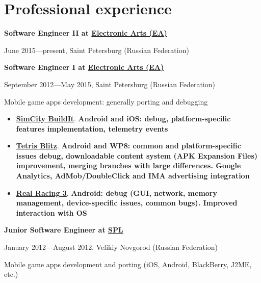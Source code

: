 \section{Professional experience}
{
\fontsize{12pt}{12pt}\selectfont
\bfseries Software Engineer II at
\href{http://www.ea.com}{Electronic Arts (EA)}
\mdseries
}

{
\fontsize{9pt}{8pt}\selectfont
June 2015---present, Saint Petersburg (Russian Federation)
}
\vspace{5pt}

{
\fontsize{12pt}{12pt}\selectfont
\bfseries Software Engineer I at
\href{http://www.ea.com}{Electronic Arts (EA)}
\mdseries
}

{
\fontsize{9pt}{8pt}\selectfont
September 2012---May 2015, Saint Petersburg (Russian Federation)
}

\subitem Mobile game apps development: generally porting and debugging
\begin{itemize}
\setlength{\itemindent}{20pt}
\item
    \href{http://www.ea.com/simcity-buildit}
        {\bfseries SimCity BuildIt\mdseries}.
        \bfseries Android \mdseries and \bfseries iOS\mdseries:
        debug,
        platform-specific features implementation,
        telemetry events
\item
    \href{http://www.tetrisblitz.com}
        {\bfseries Tetris Blitz\mdseries}.
        \bfseries Android \mdseries and \bfseries WP8\mdseries:
        common and platform-specific issues debug,
        downloadable content system (APK Expansion Files) improvement,
        merging branches with large differences.
        Google Analytics, AdMob/DoubleClick and IMA advertising integration
\item
    \href{http://www.ea.com/real-racing-3}
    {\bfseries Real Racing 3\mdseries}.
        \bfseries Android\mdseries:
        debug (GUI, network, memory management, device-specific issues, common bugs).
        Improved interaction with OS
\end{itemize}

\vspace{5pt}

{
\fontsize{12pt}{12pt}\selectfont
\bfseries Junior Software Engineer at
\href{http://spl.co}{\bfseries SPL\mdseries}
\mdseries
}

{
\fontsize{9pt}{8pt}\selectfont
January 2012---August 2012, Velikiy Novgorod (Russian Federation)
}

Mobile game apps development and porting
(iOS, Android, BlackBerry, J2ME, etc.)

